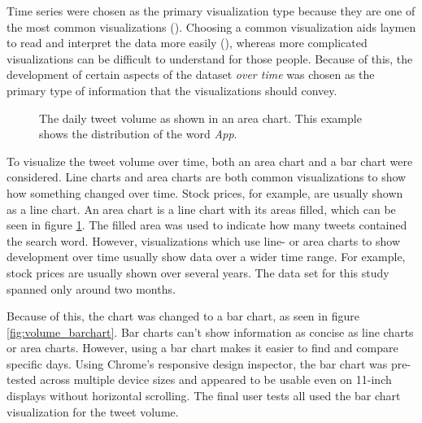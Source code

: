 Time series were chosen as the primary visualization type because they are one of the most common visualizations (\cite{heer2010}). Choosing a common visualization aids laymen to read and interpret the data more easily (\cite{borner2016}), whereas more complicated visualizations can be difficult to understand for those people. Because of this, the development of certain aspects of the dataset \emph{over time} was chosen as the primary type of information that the visualizations should convey.

\begin{figure}[h!tb]
    \caption{The daily tweet volume as shown in an area chart. This example shows the distribution of the word \emph{App}.}
    \label{fig:volume_areachart}
\end{figure}

To visualize the tweet volume over time, both an area chart and a bar chart were considered. Line charts and area charts are both common visualizations to show how something changed over time. Stock prices, for example, are usually shown as a line chart. An area chart is a line chart with its areas filled, which can be seen in figure \ref{fig:volume_areachart}. The filled area was used to indicate how many tweets contained the search word. However, visualizations which use line- or area charts to show development over time usually show data over a wider time range. For example, stock prices are usually shown over several years. The data set for this study spanned only around two months.

Because of this, the chart was changed to a bar chart, as seen in figure \ref{fig:volume_barchart}. Bar charts can't show information as concise as line charts or area charts. However, using a bar chart makes it easier to find and compare specific days. Using Chrome's responsive design inspector, the bar chart was pre-tested across multiple device sizes and appeared to be usable even on 11-inch displays without horizontal scrolling. The final user tests all used the bar chart visualization for the tweet volume.

